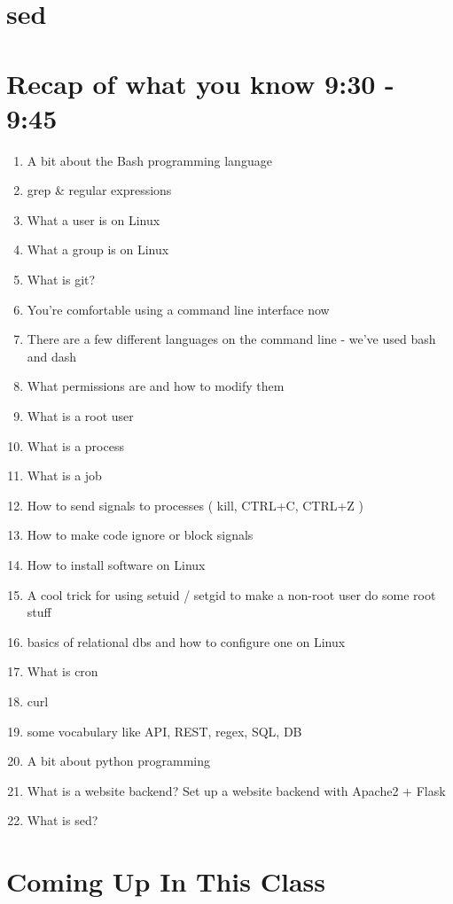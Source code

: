 \documentclass[10pt]{article}
\begin{document}
\pagebreak

\section{sed}

\section{Recap of what you know 9:30 - 9:45}
\begin{enumerate}
\item A bit about the Bash programming language
\item grep \& regular expressions
\item What a user is on Linux
\item What a group is on Linux
\item What is git?
\item You're comfortable using a command line interface now
\item There are a few different languages on the command line - we've used bash and dash
\item What permissions are and how to modify them
\item What is a root user
\item What is a process
\item What is a job
\item How to send signals to processes ( kill, CTRL+C, CTRL+Z )
\item How to make code ignore or block signals
\item How to install software on Linux
\item A cool trick for using setuid / setgid to make a non-root user do some root stuff
\item basics of relational dbs and how to configure one on Linux
\item What is cron
\item curl
\item some vocabulary like API, REST, regex, SQL, DB
\item A bit about python programming
\item What is a website backend? Set up a website backend with Apache2 + Flask
\item What is sed?
\end{enumerate}

\section{Coming Up In This Class}
\end{document}
